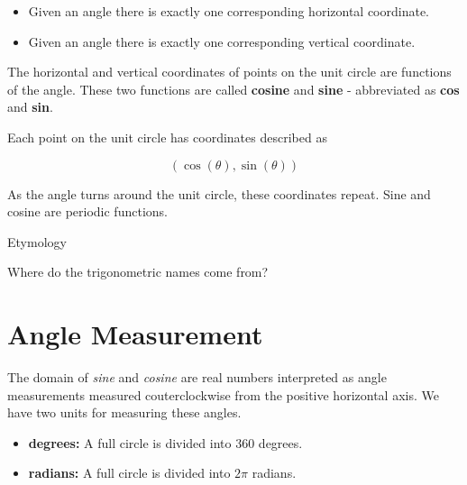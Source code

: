 \documentclass{ximera}
\begin{document}
\begin{example}
\begin{itemize}
\item Given an angle there is exactly one corresponding horizontal coordinate.
\item Given an angle there is exactly one corresponding vertical coordinate. 
\end{itemize}


The horizontal and vertical coordinates of points on the unit circle are functions of the angle.  These two functions are called \textbf{cosine} and \textbf{sine} - abbreviated as \textbf{cos} and \textbf{sin}.

Each point on the unit circle has coordinates described as 

\[  (\cos(\theta), \sin(\theta))  \] 

As the angle turns around the unit circle, these coordinates repeat. Sine and cosine are periodic functions.

\end{example}




\begin{remark}  Etymology


Where do the trigonometric names come from?  

\end{remark}











\section{Angle Measurement}

The domain of \textit{sine} and \textit{cosine} are real numbers interpreted as angle measurements measured couterclockwise from the positive horizontal axis.  We have two units for measuring these angles.


\begin{itemize}
\item \textbf{degrees:}  A full circle is divided into $360$ degrees.
\item \textbf{radians:}  A full circle is divided into $2\pi$ radians.
\end{itemize}
\end{document}
